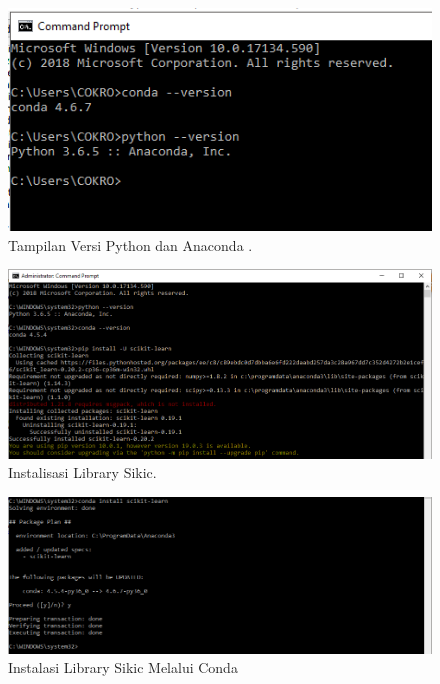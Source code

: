 \begin{figure}[ht]
      \centerline{\includegraphics[width=1\textwidth]
      {figures/c}}
      \caption{Tampilan Versi Python dan Anaconda .}
      \label{c}
      \end{figure}

\begin{figure}[ht]
      \centerline{\includegraphics[width=1\textwidth]
      {figures/c1}}
      \caption{Instalisasi Library Sikic.}
      \label{c1}
      \end{figure}

\begin{figure}[ht]
      \centerline{\includegraphics[width=1\textwidth]
      {figures/c2}}
      \caption{Instalasi Library Sikic Melalui Conda}
      \label{c2}
      \end{figure}

